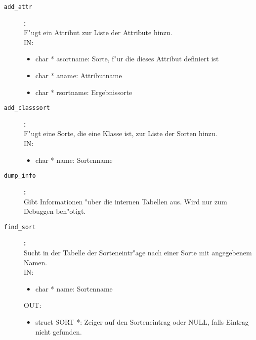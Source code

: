 \begin{description}
\begin{itemize}
\end{itemize}
\item[\tt add\_attr
]{\bf :\\}
F"ugt ein Attribut zur Liste der Attribute hinzu.
 \\
IN:
\begin{itemize}
   \item char * asortname: Sorte, f"ur die dieses Attribut
definiert ist
\item char * aname: Attributname
\item char * rsortname: Ergebnissorte

\end{itemize}
\item[\tt add\_classsort
]{\bf :\\}
F"ugt eine Sorte, die eine Klasse ist, zur Liste
 der Sorten hinzu.
 \\
IN:
\begin{itemize}
   \item char * name: Sortenname

\end{itemize}
\item[\tt dump\_info
]{\bf :\\}
Gibt Informationen "uber die internen Tabellen aus.
 Wird nur zum Debuggen ben"otigt.
 \\
\item[\tt find\_sort
]{\bf :\\}
Sucht in der Tabelle der Sorteneintr"age nach einer
 Sorte mit angegebenem Namen.
 \\
IN:
\begin{itemize}
   \item char * name: Sortenname

\end{itemize}
OUT:
\begin{itemize}
   \item struct SORT *: Zeiger auf den Sorteneintrag oder NULL,
falls Eintrag nicht gefunden.

\end{itemize}
\end{description}
